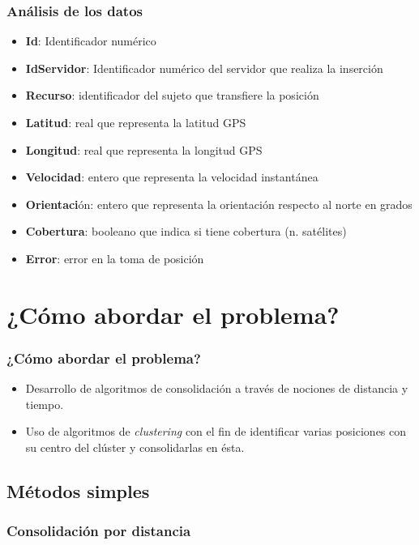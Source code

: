 \documentclass[10pt, spanish]{beamer}
\begin{document}
\begin{frame}[fragile]
\frametitle{An\'alisis de los datos}
  \begin{itemize}[<+- | alert@+>]    
\item \textbf{Id}: Identificador num\'erico
\item \textbf{IdServidor}: Identificador num\'erico del servidor que realiza la inserci\'on
\item \textbf{Recurso}: identificador del sujeto que transfiere la posici\'on
\item \textbf{Latitud}: real que representa la latitud GPS
\item \textbf{Longitud}: real que representa la longitud GPS
\item \textbf{Velocidad}: entero que representa la velocidad instant\'anea
\item \textbf{Orientaci}\'on: entero que representa la orientaci\'on respecto al norte en grados
\item \textbf{Cobertura}: booleano que indica si tiene cobertura (n. sat\'elites)
\item \textbf{Error}: error en la toma de posici\'on
  \end{itemize}
\end{frame}

\section{¿C\'omo abordar el problema?}
\begin{frame}[fragile]
\frametitle{¿C\'omo abordar el problema?}
\begin{itemize}

\item Desarrollo de algoritmos de consolidaci\'on a trav\'es de nociones de distancia y tiempo.

\item Uso de algoritmos de \textit{clustering} con el fin de identificar varias posiciones con su centro del cl\'uster y consolidarlas en \'esta.

\end{itemize}


\end{frame}


\subsection{M\'etodos simples}
\begin{frame}[fragile]
\frametitle{Consolidaci\'on por distancia}
\end{frame}
\end{document}
